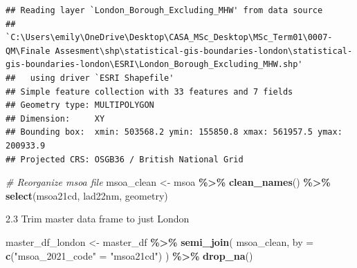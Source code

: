 \documentclass[
]{article}
\newenvironment{Shaded}{\begin{snugshade}}{\end{snugshade}}
\newcommand{\AttributeTok}[1]{\textcolor[rgb]{0.13,0.29,0.53}{#1}}
\newcommand{\CommentTok}[1]{\textcolor[rgb]{0.56,0.35,0.01}{\textit{#1}}}
\newcommand{\ConstantTok}[1]{\textcolor[rgb]{0.56,0.35,0.01}{#1}}
\newcommand{\FunctionTok}[1]{\textcolor[rgb]{0.13,0.29,0.53}{\textbf{#1}}}
\newcommand{\NormalTok}[1]{#1}
\newcommand{\OtherTok}[1]{\textcolor[rgb]{0.56,0.35,0.01}{#1}}
\newcommand{\SpecialCharTok}[1]{\textcolor[rgb]{0.81,0.36,0.00}{\textbf{#1}}}
\newcommand{\StringTok}[1]{\textcolor[rgb]{0.31,0.60,0.02}{#1}}
\begin{document}
\begin{verbatim}
## Reading layer `London_Borough_Excluding_MHW' from data source 
##   `C:\Users\emily\OneDrive\Desktop\CASA_MSc_Desktop\MSc_Term01\0007-QM\Finale Assesment\shp\statistical-gis-boundaries-london\statistical-gis-boundaries-london\ESRI\London_Borough_Excluding_MHW.shp' 
##   using driver `ESRI Shapefile'
## Simple feature collection with 33 features and 7 fields
## Geometry type: MULTIPOLYGON
## Dimension:     XY
## Bounding box:  xmin: 503568.2 ymin: 155850.8 xmax: 561957.5 ymax: 200933.9
## Projected CRS: OSGB36 / British National Grid
\end{verbatim}

\begin{Shaded}
\end{Shaded}

\begin{Shaded}
\begin{Highlighting}[]
\CommentTok{\# Reorganize msoa file}
\NormalTok{msoa\_clean }\OtherTok{\textless{}{-}}\NormalTok{ msoa }\SpecialCharTok{\%\textgreater{}\%} 
  \FunctionTok{clean\_names}\NormalTok{() }\SpecialCharTok{\%\textgreater{}\%} 
  \FunctionTok{select}\NormalTok{(msoa21cd, }
\NormalTok{         lad22nm,}
\NormalTok{         geometry)}
\end{Highlighting}
\end{Shaded}

2.3 Trim master data frame to just London

\begin{Shaded}
\begin{Highlighting}[]
\NormalTok{master\_df\_london }\OtherTok{\textless{}{-}}\NormalTok{ master\_df }\SpecialCharTok{\%\textgreater{}\%}
  \FunctionTok{semi\_join}\NormalTok{(}
\NormalTok{    msoa\_clean,}
    \AttributeTok{by =} \FunctionTok{c}\NormalTok{(}\StringTok{"msoa\_2021\_code"} \OtherTok{=} \StringTok{"msoa21cd"}\NormalTok{)}
\NormalTok{  ) }\SpecialCharTok{\%\textgreater{}\%} 
  \FunctionTok{drop\_na}\NormalTok{()}
\end{Highlighting}
\end{Shaded}
\end{document}

